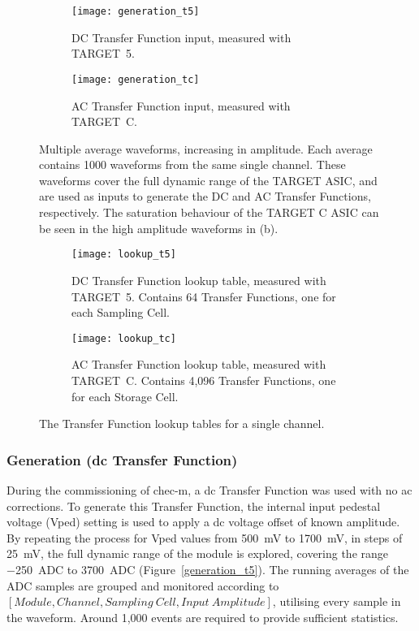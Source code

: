 \begin{figure}
  \begin{subfigure}[b]{0.49\textwidth}
    \texttt{[image: generation\_t5]}
    \caption{DC Transfer Function input, measured with TARGET~5.}
    \label{fig:generation_t5}
  \end{subfigure}
  \hfill
  \begin{subfigure}[b]{0.49\textwidth}
    \texttt{[image: generation\_tc]}
    \caption{AC Transfer Function input, measured with TARGET~C.}
    \label{fig:generation_tc}
  \end{subfigure}
  \caption[Transfer Function generation waveforms.]{Multiple average waveforms, increasing in amplitude. Each average contains 1000 waveforms from the same single channel. These waveforms cover the full dynamic range of the TARGET ASIC, and are used as inputs to generate the DC and AC Transfer Functions, respectively. The saturation behaviour of the TARGET C ASIC can be seen in the high amplitude waveforms in (b).}
\end{figure}

\begin{figure}
  \begin{subfigure}[b]{0.49\textwidth}
    \texttt{[image: lookup\_t5]}
    \caption{DC Transfer Function lookup table, measured with TARGET~5. Contains 64 Transfer Functions, one for each Sampling Cell.}
    \label{fig:lookup_t5}
  \end{subfigure}
  \hfill
  \begin{subfigure}[b]{0.49\textwidth}
    \texttt{[image: lookup\_tc]}
    \caption{AC Transfer Function lookup table, measured with TARGET~C. Contains 4,096 Transfer Functions, one for each Storage Cell.}
    \label{fig:lookup_tc}
  \end{subfigure}
  \caption[Transfer Function lookup tables.]{The Transfer Function lookup tables for a single channel.}
\end{figure}

\subsubsection{Generation (\gls{dc} Transfer Function)}

During the commissioning of \gls{chec-m}, a \gls{dc} Transfer Function was used with no \gls{ac} corrections. To generate this Transfer Function, the internal input pedestal voltage (Vped) setting is used to apply a \gls{dc} voltage offset of known amplitude. By repeating the process for Vped values from \SI{500}{mV} to \SI{1700}{mV}, in steps of \SI{25}{mV}, the full dynamic range of the module is explored, covering the range \SI{-250}{ADC} to \SI{3700}{ADC} (Figure~\ref{generation_t5}). The running averages of the ADC samples are grouped and monitored according to $[Module, Channel, Sampling~Cell, Input~Amplitude]$, utilising every sample in the waveform. Around 1,000 events are required to provide sufficient statistics.

